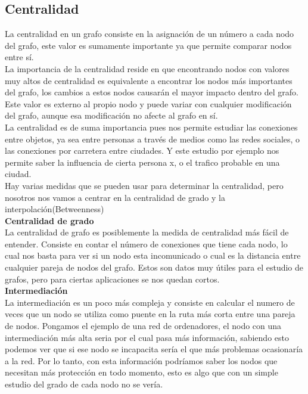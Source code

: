\documentclass[12pt,a4paper]{article}
\begin{document}
		\subsection{Centralidad}
			La centralidad en un grafo consiste en la asignación de un número a cada nodo del grafo, este valor es sumamente importante ya que permite comparar nodos entre sí.\\
			La importancia de la centralidad reside en que encontrando nodos con valores muy altos de centralidad es equivalente a encontrar los nodos más importantes del grafo, los cambios a estos nodos causarán el mayor impacto dentro del grafo. Este valor es externo al propio nodo y puede variar con cualquier modificación del grafo, aunque esa modificación no afecte al grafo en sí.\\
			La centralidad es de suma importancia pues nos permite estudiar las conexiones entre objetos, ya sea entre personas a través de medios como las redes sociales, o las conexiones por carretera entre ciudades. Y este estudio por ejemplo nos permite saber la influencia de cierta persona x, o el trafico probable en una ciudad.\\
			Hay varias medidas que se pueden usar para determinar la centralidad, pero nosotros nos vamos a centrar en la centralidad de grado y la interpolación(Betweenness)\\
			{\textbf{Centralidad de grado}}\\
				La centralidad de grafo es posiblemente la medida de centralidad más fácil de entender. Consiste en contar el número de conexiones que tiene cada nodo, lo cual nos basta para ver si un nodo esta incomunicado o cual es la distancia entre cualquier pareja de nodos del grafo. Estos son datos muy útiles para el estudio de grafos, pero para ciertas aplicaciones se nos quedan cortos.\\ 
			{\textbf{Intermediación}}\\
				La intermediación es un poco más compleja y consiste en calcular el numero de veces que un nodo se utiliza como puente en la ruta más corta entre una pareja de nodos. Pongamos el ejemplo de una red de ordenadores, el nodo con una intermediación más alta seria por el cual pasa más información, sabiendo esto podemos ver que si ese nodo se incapacita sería el que más problemas ocasionaría a la red. Por lo tanto, con esta información podríamos saber los nodos que necesitan más protección en todo momento, esto es algo que con un simple estudio del grado de cada nodo no se vería.\\
\end{document}
